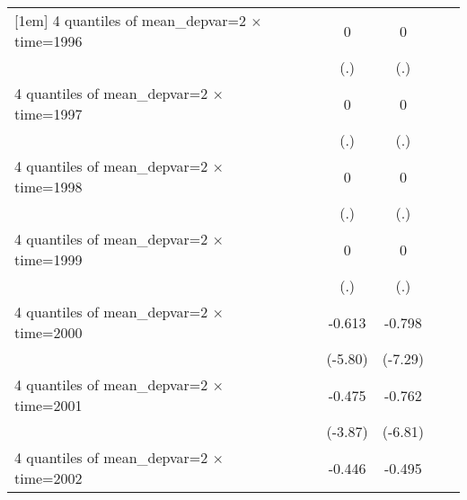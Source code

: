 \begin{table}[htbp]
\begin{tabular}{l*{6}{c}}
[1em]
4 quantiles of mean\_depvar=2 $\times$ time=1996&                     &                     &           0         &           0         &                     &                     \\
                    &                     &                     &         (.)         &         (.)         &                     &                     \\
[1em]
4 quantiles of mean\_depvar=2 $\times$ time=1997&                     &                     &           0         &           0         &                     &                     \\
                    &                     &                     &         (.)         &         (.)         &                     &                     \\
[1em]
4 quantiles of mean\_depvar=2 $\times$ time=1998&                     &                     &           0         &           0         &                     &                     \\
                    &                     &                     &         (.)         &         (.)         &                     &                     \\
[1em]
4 quantiles of mean\_depvar=2 $\times$ time=1999&                     &                     &           0         &           0         &                     &                     \\
                    &                     &                     &         (.)         &         (.)         &                     &                     \\
[1em]
4 quantiles of mean\_depvar=2 $\times$ time=2000&                     &                     &      -0.613\sym{***}&      -0.798\sym{***}&                     &                     \\
                    &                     &                     &     (-5.80)         &     (-7.29)         &                     &                     \\
[1em]
4 quantiles of mean\_depvar=2 $\times$ time=2001&                     &                     &      -0.475\sym{***}&      -0.762\sym{***}&                     &                     \\
                    &                     &                     &     (-3.87)         &     (-6.81)         &                     &                     \\
[1em]
4 quantiles of mean\_depvar=2 $\times$ time=2002&                     &                     &      -0.446\sym{***}&      -0.495\sym{***}&                     &                     \\

\end{tabular}
\end{table}
